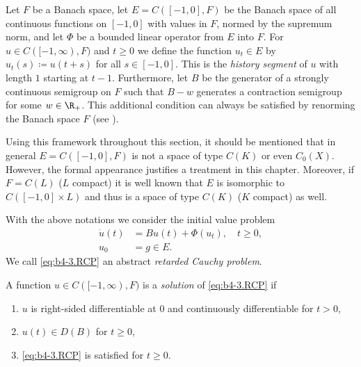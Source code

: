 Let $F$ be a Banach space, let $E = C([-1,0],F)$ be the Banach space of all continuous functions on $[-1,0]$ with values in $F$, normed by the supremum norm, and let $\Phi$ be a bounded linear operator from $E$ into $F$.
For $u \in C([-1,\infty),F)$ and $t \geq 0$ we define the function $u_{t} \in E$ by $u_{t}(s) \coloneq  u(t+s)$ for all $s \in [-1,0]$.
This is the \emph{history segment} of\/ $u$ with length $1$ starting at $t-1$.
Furthermore, let $B$ be the generator of a strongly continuous semigroup on $F$ such that $B - w$ generates a contraction semigroup for some $w \in \R_{+}$.
This additional condition can always be satisfied by renorming the Banach space $F$ (see \eg \textcite[Theorem~2.13]{goldstein:1985a}).

Using this framework throughout this section, it should be mentioned that in general $E = C([-1,0],F)$ is not a space of type $C(K)$ or even $C_{0}(X)$.
However, the formal appearance justifies a treatment in this chapter.
Moreover, if\/ $F = C(L)$ ($L$ compact) it is well known that $E$ is isomorphic to $C([-1,0] \times L)$ and thus is a space of type $C(K)$ ($K$ compact) as well.

With the above notations we consider the initial value problem
\begin{equation*}\label{eq:b4-3.RCP} \tag{RCP}
	\begin{split}
		\dot{u}(t) &= Bu(t) + \Phi(u_{t}), \quad t \geq 0, \\
		u_{0} &= g \in E.
	\end{split}
\end{equation*}
We call \eqref{eq:b4-3.RCP} an abstract \emph{retarded Cauchy problem}.

A function $u \in C([-1,\infty),F)$ is a \emph{solution} of \eqref{eq:b4-3.RCP} if
\begin{enumerate}[\upshape (i)]
	\item 
	$u$ is right-sided differentiable at 0 and continuously differentiable for $t  >  0$,
	
	\item 
	$u(t) \in D(B)$ for $t \geq 0$,
    
	\item 
	 \eqref{eq:b4-3.RCP} is satisfied for $t \geq 0$.
\end{enumerate}

